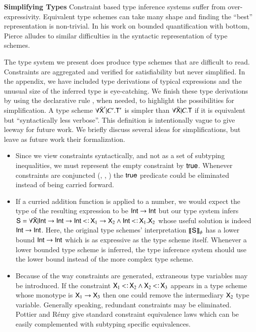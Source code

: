 \documentclass{report}
\begin{document}
  \noindent\textbf{Simplifying Types}
  Constraint based type inference systems suffer from over-expressivity. Equivalent
  type schemes can take many shape and finding the ``best'' representation
  is non-trivial. In his work on bounded quantification with bottom, Pierce \cite{Pierce:BQB}
  alludes to similar difficulties in the syntactic representation of type schemes.
  
  The type system we present does produce type schemes that are difficult to read.
  Constraints are aggregated and verified for satisfiability but never simplified.
  In the appendix, we have included type derivations of typical expressions
  and the unusual size of the inferred type is eye-catching. We finish
  these type derivations by using the declarative rule \decsub, when needed,
  to highlight the possibilities for simplification. A type scheme $\forall\bar{\textsf{X}}'|C'.\textsf{T}'$
  is simpler than $\forall\bar{\textsf{X}}|C.\textsf{T}$ if it is equivalent
  but ``syntactically less verbose''. This definition is intentionally vague
  to give leeway for future work. We briefly discuss several
  ideas for simplifications, but leave as future work their
  formalization.
  
  \begin{itemize}
    \item Since we view constraints syntactically, and not as a set of subtyping
      inequalities, we must represent the empty constraint by $\textsf{true}$. Whenever
      constraints are conjuncted (\sdrec, \sdsel, \sdapp) the $\textsf{true}$ predicate
      could be eliminated instead of being carried forward.
    
    \item If a curried addition function is applied to a number, we would expect the
      type of the resulting expression to be $\textsf{Int}\rightarrow\textsf{Int}$ but our type system infers
      $\type{S}=\forall\bar{\type{X}}|\Int\fun\Int\fun\Int\subtype\type{X}_1\fun\type{X}_2\land\Int\subtype\type{X}_1.\type{X}_2$
      whose useful solution is indeed $\textsf{Int}\rightarrow\textsf{Int}$. Here, the original type schemes'
      interpretation $\llbracket{\textsf{S}}\rrbracket_{\phi}$ has a lower bound $\textsf{Int}\rightarrow\textsf{Int}$
      which is as expressive as the type scheme itself. Whenever a lower bounded
      type scheme is inferred, the type inference system should use the lower bound
      instead of the more complex type scheme.
  
    \item Because of the way constraints are generated, extraneous type variables
      may be introduced. If the constraint $\type{X}_1\subtype\type{X}_2\land\type{X}_2\subtype\type{X}_3$
      appears in a type scheme whose monotype is $\textsf{X}_1\rightarrow\textsf{X}_3$ then
      one could remove the intermediary $\textsf{X}_2$ type variable. Generally speaking,
      redundant constraints may be eliminated. Pottier and R\'emy \cite{pottier-remy-emlti}
      give standard constraint equivalence laws which can be easily complemented
      with subtyping specific equivalences.
  \end{itemize}
  
\end{document}
